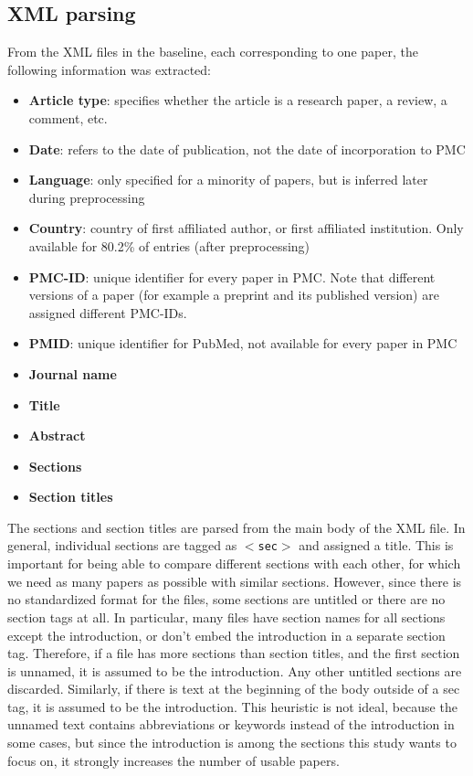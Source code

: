 \subsection{XML parsing}
From the XML files in the baseline, each corresponding to one paper, the following information was extracted:
\begin{itemize}
    \item \textbf{Article type}: specifies whether the article is a research paper, a review, a comment, etc.
    \item \textbf{Date}: refers to the date of publication, not the date of incorporation to PMC
    \item \textbf{Language}: only specified for a minority of papers, but is inferred later during preprocessing 
    \item \textbf{Country}: country of first affiliated author, or first affiliated institution. Only available for 80.2\% of entries (after preprocessing)
    \item \textbf{PMC-ID}: unique identifier for every paper in PMC. Note that different versions of a paper (for example a preprint and its published version) are assigned different PMC-IDs.
    \item \textbf{PMID}: unique identifier for PubMed, not available for every paper in PMC
    \item \textbf{Journal name}
    \item \textbf{Title}
    \item \textbf{Abstract}
    \item \textbf{Sections}
    \item \textbf{Section titles}
\end{itemize}
The sections and section titles are parsed from the main body of the XML file.
In general, individual sections are tagged as \texttt{$<$sec$>$} and assigned a title.
This is important for being able to compare different sections with each other, for which we need as many papers as possible with similar sections.
However, since there is no standardized format for the files, some sections are untitled or there are no section tags at all.
In particular, many files have section names for all sections except the introduction, or don't embed the introduction in a separate section tag. 
Therefore, if a file has more sections than section titles, and the first section is unnamed, it is assumed to be the introduction.
Any other untitled sections are discarded.
Similarly, if there is text at the beginning of the body outside of a sec tag, it is assumed to be the introduction. 
This heuristic is not ideal, because the unnamed text contains abbreviations or keywords instead of the introduction in some cases, but since the introduction is among the sections this study wants to focus on, it strongly increases the number of usable papers.
\\\\

